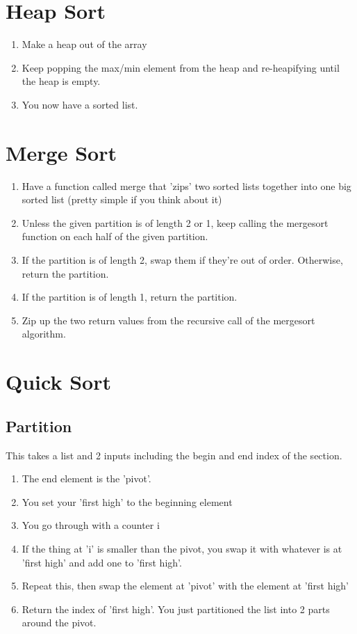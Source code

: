 \documentclass[a4paper,12pt]{report}
\begin{document}
\section{Heap Sort}
\begin{enumerate}
\item Make a heap out of the array
\item Keep popping the max/min element from the heap and re-heapifying until the heap is empty.
\item You now have a sorted list.
\end{enumerate}

\section{Merge Sort}
\begin{enumerate}
\item Have a function called merge that 'zips' two sorted lists together into one big sorted list (pretty simple if you think about it)
\item Unless the given partition is of length 2 or 1, keep calling the mergesort function on each half of the given partition.
\item If the partition is of length 2, swap them if they're out of order. Otherwise, return the partition.
\item If the partition is of length 1, return the partition.
\item Zip up the two return values from the recursive call of the mergesort algorithm.
\end{enumerate}

\section{Quick Sort}
\subsection{Partition}
This takes a list and 2 inputs including the begin and end index of the section.
\begin{enumerate}
\item The end element is the 'pivot'.
\item You set your 'first high' to the beginning element
\item You go through with a counter i
\item If the thing at 'i' is smaller than the pivot, you swap it with whatever is at 'first high' and add one to 'first high'.
\item Repeat this, then swap the element at 'pivot' with the element at 'first high'
\item Return the index of 'first high'. You just partitioned the list into 2 parts around the pivot.
\end{enumerate}
\end{document}
